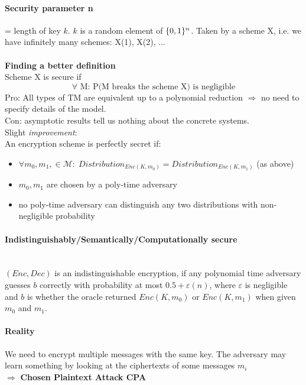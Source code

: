 \paragraph{Security parameter n} = length of key $k$. $k$ is a random element of $\lbrace 0, 1 \rbrace^n$.
Taken by a scheme X, i.e. we have infinitely many schemes: X(1), X(2), ...
\\ \\
\textbf{Finding a better definition} \\
Scheme X is secure if
$$\forall \text{ M: P(M breaks the scheme X) is negligible}$$
Pro: All types of TM are equivalent up to a polynomial reduction $\Rightarrow$ no need to specify details of the model. \\
Con: asymptotic results tell us nothing about the concrete systems.
\\
\newpage
Slight \textit{improvement}: \\
An encryption scheme is perfectly secret if:
\begin{itemize}
    \item $\forall m_0, m_1, \in \mathcal{M}: \; Distribution_{Enc(K, m_0)} = Distribution_{Enc(K,m_1)}$ \linebreak (as above)
    \item $m_0, m_1$ are chosen by a poly-time adversary
    \item no poly-time adversary can distinguish any two distributions with non-negligible probability
\end{itemize}

\paragraph{Indistinguishably/Semantically/Computationally secure} \mbox{}\\
$(Enc, Dec)$ is an indistinguishable encryption, if any polynomial time adversary guesses $b$ correctly with probability at most $0.5+\varepsilon(n)$, where $\varepsilon$ is negligible and $b$ is whether the oracle returned $Enc(K, m_0)$ or $Enc(K, m_1)$ when given $m_0$ and $m_1$.

\paragraph{Reality} We need to encrypt multiple messages with the same key. The adversary may learn something by looking at the ciphertexts of some messages $m_i$ \\
$\Rightarrow$ \textbf{Chosen Plaintext Attack CPA}

